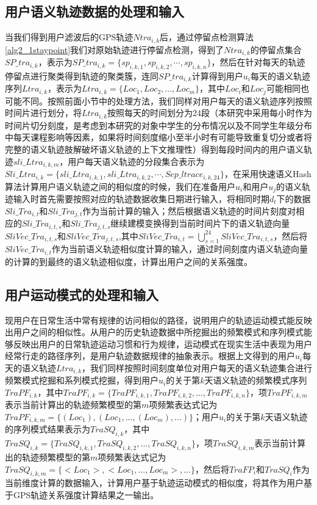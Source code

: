 \subsection{用户语义轨迹数据的处理和输入}
当我们得到用户滤波后的GPS轨迹$Ntra_{i,k}$后，通过停留点检测算法\ref{alg2_1staypoint}我们对原始轨迹进行停留点检测，得到了$Ntra_{i,k}$的停留点集合$SP\_tra_{i,k}$，表示为$SP\_tra_{i,k}=\{ sp_{i,k,1},sp_{i,k,2},\cdots , sp_{i,k,n} \}$，然后在针对每天的轨迹停留点进行聚类得到轨迹的聚类簇，连同$SP\_tra_{i,k}$计算得到用户$u_{i}$每天的语义轨迹序列$Ltra_{i,k}$，表示为$ Ltra_{i,k}=\{Loc_{1},Loc_{2},...,Loc_{m}\}$，其中$Loc_{i}$和$Loc_{j}$可能相同也可能不同。按照前面小节中的处理方法，我们同样对用户每天的语义轨迹序列按照时间片进行划分，将$ Ltra_{i,k}$按照每天的时间划分为24段（本研究中采用每小时作为时间片切分刻度，是考虑到本研究的对象中学生的分布情况以及不同学生年级分布中每天课程影响等因素，如果将时间刻度缩小至半小时有可能导致重复切分或者将完整的语义轨迹肢解破坏语义轨迹的上下文推理性）得到每段时间内的用户语义轨迹$sli\_Ltra_{i,k,m}$，用户每天语义轨迹的分段集合表示为$Sli\_Ltra_{i,k}=\{sli\_Ltra_{i,k,1},sli\_Ltra_{i,k,2},\cdots,Sep\_ltrace_{i,k,24}\}$，在采用快速语义Hash算法计算用户语义轨迹之间的相似度的时候，我们在准备用户$u_{i}$和用户$u_{j}$的语义轨迹输入时首先需要按照对应的轨迹数据收集日期进行输入，将相同时期$d_{t}$下的数据$Sli\_Tra_{i,t}$和$Sli\_Tra_{j,t}$作为当前计算的输入；然后根据语义轨迹的时间片刻度对相应的$Sli\_Tra_{i,t,s}$和$Sli\_Tra_{j,t,s}$继续建模变换得到当前时间片下的语义轨迹向量$SliVec\_Tra_{i,t,s}$和$SliVec\_Tra_{j,t,s}$,其中$SliVec\_Tra_{i,t}=\bigcup_{s=1}^{24}SliVec\_Tra_{i,t,s}$，然后将$SliVec\_Tra_{i,t}$作为当前语义轨迹相似度计算的输入，通过时间刻度内语义轨迹向量的计算的到最终的语义轨迹相似度，计算出用户之间的关系强度。

\subsection{用户运动模式的处理和输入}
现用户在日常生活中常有规律的访问相似的路径，说明用户的轨迹运动模式能反映出用户之间的相似性。从用户的历史轨迹数据中所挖掘出的频繁模式和序列模式能够反映出用户的日常轨迹运动习惯和行为规律，运动模式在现实生活中表现为用户经常行走的路径序列，是用户轨迹数据规律的抽象表示。根据上文得到的用户$u_{i}$每天的语义轨迹$Ltra_{i,k}$，我们同样按照时间刻度单位对用户每天的语义轨迹集合进行频繁模式挖掘和系列模式挖掘，得到用户$u_{i}$的关于第$k$天语义轨迹的频繁模式序列$TraPF_{i,k}$，其中$TraPF_{i,k}=\{ TraPF_{i,k,1},TraPF_{i,k,2},...,TraPF_{i,k,n} \}$，项$TraPF_{i,k,m}$表示当前计算出的轨迹频繁模型的第$m$项频繁表达式记为$TraPF_{i,k,m}=\{  (Loc_{1}),(Loc_{1},...,(Loc_{m}),...)  \}$；用户$u_{i}$的关于第$k$天语义轨迹的序列模式结果表示为$TraSQ_{i,k}$，其中$TraSQ_{i,k}=\{ TraSQ_{i,k,1},TraSQ_{i,k,2},...,TraSQ_{i,k,n} \}$，项$TraSQ_{i,k,m}$表示当前计算出的轨迹频繁模型的第$m$项频繁表达式记为$TraSQ_{i,k,m}=\{  <Loc_{1}>,< Loc_{1},...,Loc_{m}>,...\}$，然后将$TraFP_{i}$和$TraSQ_{i}$作为当前维度计算的数据输入，计算用户基于轨迹运动模式的相似度，将其作为用户基于GPS轨迹关系强度计算结果之一输出。

